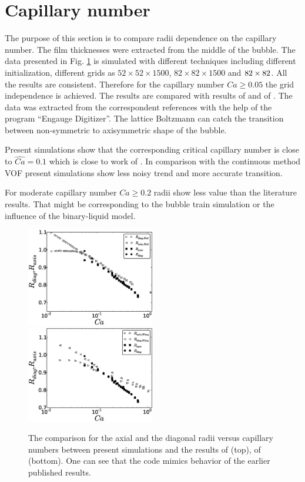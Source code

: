 \documentclass{article}
\begin{document}
\section{Capillary number}
The purpose of this section is to compare radii dependence on the capillary number. The film
thicknesses were extracted from the middle of the bubble. The data presented in Fig.
\ref{fig:capillary:comparison} is simulated with different techniques including different
initialization, different grids as $52 \times 52 \times 1500$, $82 \times 82 \times 1500$ and $82
\times 82 \time 2400$. All the results are consistent. Therefore for the capillary number $Ca\geq
0.05$ the grid independence is achieved. The results are compared with results of
\citet{heil-threedim} and of \citet{wang-non-circular}. The data was extracted from the
correspondent references with the help of the program ``Engauge Digitizer''. The lattice Boltzmann
can catch the transition between non-symmetric to axisymmetric shape of the bubble. 

Present simulations show that the corresponding critical capillary number is close to
$\widehat{Ca}=0.1$ which is close to work of \citet{wang-non-circular}. 
In comparison with
the continuous method VOF \cite{wang-non-circular} present simulations show less noisy trend and
more accurate transition. 

For moderate capillary number $Ca\geq 0.2$ radii show less value than the literature results. That
might be corresponding to the bubble train simulation or the influence of the binary-liquid model. 
\begin{figure}[ht]
\includegraphics[width=0.5\textwidth]{Figures/capillaries_comparison_heil.eps}
\includegraphics[width=0.5\textwidth]{Figures/capillaries_comparison_wang.eps}\\
\caption{The comparison for the axial and the diagonal radii
versus capillary numbers between present simulations and the results of \citet{heil-threedim}
(top), of \citet{wang-non-circular} (bottom). One can see that
the code mimics
behavior of the earlier published results.  \label{fig:capillary:comparison}} 
\end{figure}
\end{document}
